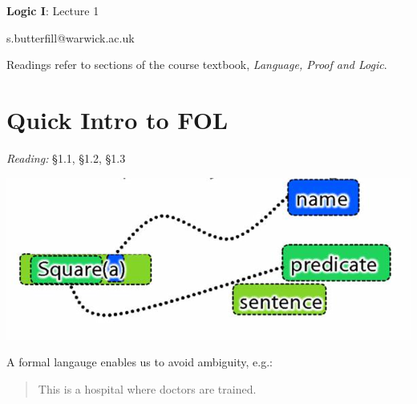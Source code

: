 \documentclass[12pt]{extarticle}
\date{}
\makeatletter
\def \ititle {Origins of Mind}
\def \isubtitle {Lecture 08}
\def \iemail{s.butterfill@warwick.ac.uk}
\makeatother
\begin{document}

\begin{multicols*}{3}

\setlength\footnotesep{1em}







\def \ititle {Logic I}
 
\def \isubtitle {Lecture 1}
 
\begin{center}
 
{\Large
 
\textbf{\ititle}: \isubtitle
 
}
 
 
 
\iemail %
 
\end{center}
 
Readings refer to sections of the course textbook, \emph{Language, Proof and Logic}.
 
 
 
\section{Quick Intro to FOL}
 
\emph{Reading:} §1.1, §1.2, §1.3
 
\begin{center}
\includegraphics[scale=0.3]{img/name_predicate_sentence.png}
\end{center}
A formal langauge enables us to avoid ambiguity, e.g.:
 
\begin{quote}
 
This is a hospital where doctors are trained.
 

\end{quote}
\end{multicols*}
\end{document}
